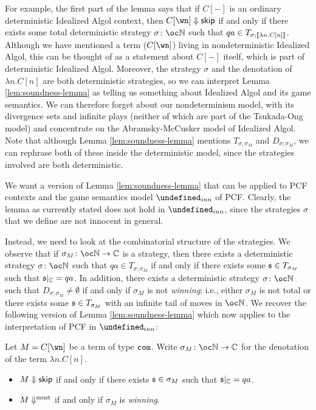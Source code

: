 \documentclass[sigplan,10pt,review]{acmart}\settopmatter{printfolios=true,printccs=false,printacmref=false}
\let\G\undefined
\begin{document}
For example, the first part of the lemma says that if $C[-]$ is an ordinary deterministic Idealized Algol context, then $C[\wn]\converges\skipp$ if and only if there exists some total deterministic strategy $\sigma\from\oc\bN$ such that $qa\in T_{\sigma;\left\llbracket\lambda n.C[n]\right\rrbracket}$.  
Although we have mentioned a term ($C[\wn]$) living in nondeterministic Idealized Algol, this can be thought of as a statement about $C[-]$ itself, which is part of deterministic Idealized Algol.  
Moreover, the strategy $\sigma$ and the denotation of $\lambda n.C[n]$ are both deterministic strategies, so we can interpret Lemma \ref{lem:soundness-lemma} as telling us something about Idealized Algol and its game semantics.  
We can therefore forget about our nondeterminism model, with its divergence sets and infinite plays (neither of which are part of the Tsukada-Ong model) and concentrate on the Abramsky-McCusker model of Idealized Algol.
Note that although Lemma \ref{lem:soundness-lemma} mentions $T_{\sigma;\sigma_M}$ and $D_{\sigma;\sigma_M}$, we can rephrase both of these inside the deterministic model, since the strategies involved are both deterministic.  

We want a version of Lemma \ref{lem:soundness-lemma} that can be applied to PCF contexts and the game semantics model $\G_{inn}$ of PCF.  
Clearly, the lemma as currently stated does not hold in $\G_{inn}$, since the strategies $\sigma$ that we define are not innocent in general.  

Instead, we need to look at the combinatorial structure of the strategies.  
We observe that if $\sigma_M\from\oc\bN\to\bC$ is a strategy, then there exists a deterministic strategy $\sigma\from\oc\bN$ such that $qa\in T_{\sigma;\sigma_M}$ if and only if there exists some $\mathfrak s\in T_{\sigma_M}$ such that $\mathfrak s\vert_{\mathbb{C}}=qa$.  
In addition, there exists a deterministic strategy $\sigma\from\oc\bN$ such that $D_{\sigma;\sigma_M}\ne\emptyset$ if and only if $\sigma_M$ is not \emph{winning}; i.e., either $\sigma_M$ is not total or there exists some $\mathfrak s\in T_{\sigma_M}$ with an infinite tail of moves in $\oc\bN$.  
We recover the following version of Lemma \ref{lem:soundness-lemma} which now applies to the interpretation of PCF in $\G_{inn}$:
\begin{lemma}
  Let $M=C[\wn]$ be a term of type ${\mathtt{com}}$.  
  Write $\sigma_M\from\oc\bN\to\bC$ for the denotation of the term $\lambda n.C[n]$.  
  \begin{itemize}
    \item $M\Downarrow{\mathsf{skip}}$ if and only if there exists $\mathfrak s\in \sigma_M$ such that $\mathfrak s\vert_{\mathbb{C}}=qa$.  
    \item $M\Downarrow^{\text{must}}$ if and only if $\sigma_M$ is \emph{winning}.
  \end{itemize}
  \label{lem:pcf-soundness-lemma}
\end{lemma}
\end{document}
